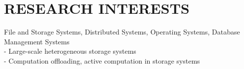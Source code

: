 \section{RESEARCH INTERESTS}
\vspace{0.07in}
File and Storage Systems, Distributed Systems, Operating Systems,
Database Management Systems \\
- Large-scale heterogeneous storage systems \\
- Computation offloading, active computation in storage systems

